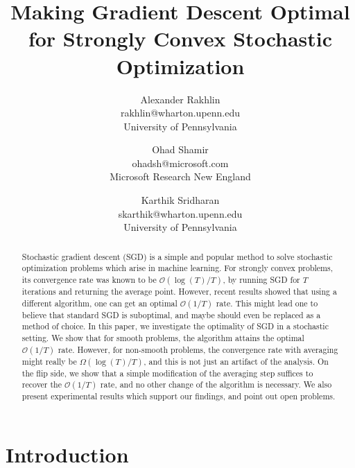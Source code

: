 \documentclass{article}
\newcommand{\Ocal}{\mathcal{O}}
\begin{document}
\title{Making Gradient Descent Optimal\\ for Strongly Convex Stochastic Optimization}
\author{Alexander Rakhlin\\rakhlin@wharton.upenn.edu\\University of Pennsylvania
\and
Ohad Shamir\\ohadsh@microsoft.com\\Microsoft Research New England
\and
Karthik Sridharan\\skarthik@wharton.upenn.edu\\University of Pennsylvania}

\date{}
\maketitle



\begin{abstract}
Stochastic gradient descent (SGD) is a simple and popular method to solve stochastic optimization problems which arise in machine learning. For strongly convex problems, its convergence rate was known to be $\Ocal(\log(T)/T)$, by running SGD for $T$ iterations and returning the average point. However, recent results showed that using a different algorithm, one can get an optimal $\Ocal(1/T)$ rate. This might lead one to believe that standard SGD is suboptimal, and maybe should even be replaced as a method of choice. In this paper, we investigate the optimality of SGD in a stochastic setting. We show that for smooth problems, the algorithm attains the optimal $\Ocal(1/T)$ rate. However, for non-smooth problems, the convergence rate with averaging might really be $\Omega(\log(T)/T)$, and this is not just an artifact of the analysis. On the flip side, we show that a simple modification of the averaging step suffices to recover the $\Ocal(1/T)$ rate, and no other change of the algorithm is necessary. We also present experimental results which support our findings, and point out open problems.
\end{abstract}

\section{Introduction}
\end{document}
